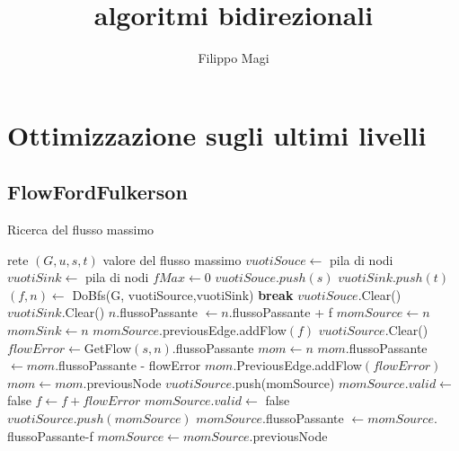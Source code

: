 \documentclass{article}
\title{algoritmi bidirezionali}
\author{Filippo Magi }
\begin{document}
\maketitle
\section{Ottimizzazione sugli ultimi livelli}
\subsection{FlowFordFulkerson}
\begin{algorithm}
    \caption{Ricerca del flusso massimo}
    \begin{algorithmic}[1]
        \REQUIRE rete $(G,u,s,t)$
        \ENSURE valore del flusso massimo
        \STATE $vuotiSouce \leftarrow  $ pila di nodi
        \STATE $vuotiSink \leftarrow $ pila di nodi
        \STATE $fMax \leftarrow 0$
        \STATE $vuotiSouce.push(s)$
        \STATE $vuotiSink.push(t)$
        \STATE $(f,n) \leftarrow$ DoBfs(G, vuotiSource,vuotiSink)
        \STATE \textbf{break}
        \ENDIF
        \STATE $vuotiSouce.$Clear()
        \STATE $vuotiSink.$Clear()
        \STATE $n$.flussoPassante $\leftarrow n.$flussoPassante + f
        \STATE $momSource \leftarrow n$
        \STATE $momSink \leftarrow n$
        \STATE $momSource$.previousEdge.addFlow$(f)$
        \STATE $vuotiSource.$Clear()
        \STATE $flowError \leftarrow $GetFlow$(s,n).$flussoPassante
        \STATE $mom \leftarrow n$
        \STATE $mom.$flussoPassante $\leftarrow mom.$flussoPassante - flowError
        \STATE $mom.$PreviousEdge.addFlow$(flowError)$
        \STATE $mom \leftarrow mom.$previousNode
        \ENDWHILE
        \STATE $vuotiSource.$push(momSource)
        \STATE $momSource.valid \leftarrow$ false
        \STATE $f \leftarrow f + flowError$
        \STATE $momSource.valid \leftarrow$ false
        \STATE $vuotiSource.push(momSource)$
        \ENDIF
        \STATE $momSource.$flussoPassante $\leftarrow momSource.$flussoPassante-f
        \STATE $momSource \leftarrow momSource.$previousNode
        \ENDWHILE
    \end{algorithmic}
\end{algorithm}
\end{document}
